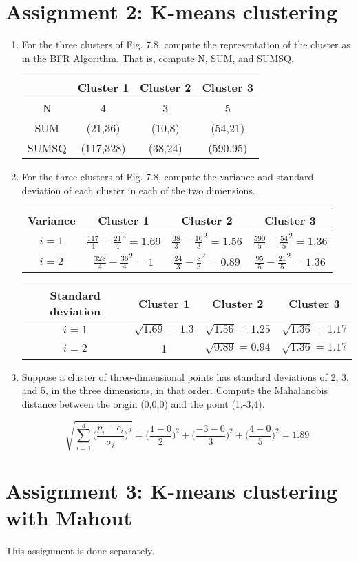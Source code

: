 \documentclass{article}
\begin{document}
\section{Assignment 2: K-means clustering}
\begin{enumerate}
\item{For the three clusters of Fig. 7.8, compute the representation of the cluster as in the BFR Algorithm. That is, compute N, SUM, and SUMSQ.
	
	\begin{center}
	\begin{tabular}{ c | c | c | c }
		      & Cluster 1 & Cluster 2 & Cluster 3 \\ \hline
		N     & 4         & 3         & 5         \\
		SUM   & (21,36)   & (10,8)    & (54,21)   \\
		SUMSQ & (117,328) & (38,24)   & (590,95)
	\end{tabular}
	\end{center}

}
\item{For the three clusters of Fig. 7.8, compute the variance and standard deviation of each cluster in each of the two dimensions.

	\begin{center}
	\begin{tabular}{ c | c | c | c }
		Variance & Cluster 1                                   & Cluster 2                                  & Cluster 3                                   \\ \hline
		$i=1$    & $\frac{117}{4}-\frac{21}{4}^2=1.69$ & $\frac{38}{3}-\frac{10}{3}^2=1.56$ & $\frac{590}{5}-\frac{54}{5}^2=1.36$ \\
		$i=2$    & $\frac{328}{4}-\frac{36}{4}^2=1$ & $\frac{24}{3}-\frac{8}{3}^2=0.89$  & $\frac{95}{5}-\frac{21}{5}^2=1.36$
	\end{tabular}
	\end{center}

	\begin{center}
	\begin{tabular}{ c | c | c | c }
		Standard deviation & Cluster 1                                   & Cluster 2                                  & Cluster 3                                   \\ \hline
		$i=1$    & $\sqrt{1.69}=1.3$ & $\sqrt{1.56}=1.25$ & $\sqrt{1.36}=1.17$ \\
		$i=2$    & 1 & $\sqrt{0.89}=0.94$  & $\sqrt{1.36}=1.17$
	\end{tabular}
\end{center}
}
\item{Suppose a cluster of three-dimensional points has standard deviations of 2, 3, and 5, in the three dimensions, in that order. Compute the Mahalanobis distance between the origin (0,0,0) and the point (1,-3,4).

\[ \sqrt{\sum_{i=1}^d\Big(\frac{p_i-c_i}{\sigma_i}\Big)^2} = \Big(\frac{1-0}{2}\Big)^2 + \Big(\frac{-3-0}{3}\Big)^2 + \Big(\frac{4-0}{5}\Big)^2 = 1.89 \]
}
\end{enumerate}

\section{Assignment 3: K-means clustering with Mahout}
This assignment is done separately.
\end{document}
